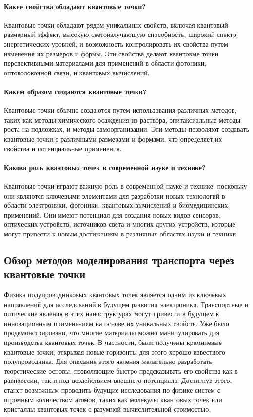 \documentclass[a4paper,14pt]{extarticle}
\begin{document}
\paragraph{Какие свойства обладают квантовые точки?}

Квантовые точки обладают рядом уникальных свойств, включая квантовый размерный эффект, высокую светоизлучающую способность, широкий спектр энергетических уровней, и возможность контролировать их свойства путем изменения их размеров и формы. Эти свойства делают квантовые точки перспективными материалами для применений в области фотоники, оптоволоконной связи, и квантовых вычислений.

\paragraph{Каким образом создаются квантовые точки?}

Квантовые точки обычно создаются путем использования различных методов, таких как методы химического осаждения из раствора, эпитаксиальные методы роста на подложках, и методы самоорганизации. Эти методы позволяют создавать квантовые точки с различными размерами и формами, что определяет их свойства и потенциальные применения.

\paragraph{Какова роль квантовых точек в современной науке и технике?}

Квантовые точки играют важную роль в современной науке и технике, поскольку они являются ключевыми элементами для разработки новых технологий в области электроники, фотоники, квантовых вычислений и биомедицинских применений. Они имеют потенциал для создания новых видов сенсоров, оптических устройств, источников света и многих других устройств, которые могут привести к новым достижениям в различных областях науки и техники.

\subsection{Обзор методов моделирования транспорта через квантовые точки}

Физика полупроводниковых квантовых точек является одним из ключевых направлений для исследований в будущем развитии электроники. Транспортные и оптические явления в этих наноструктурах могут привести в будущем к инновационным применениям на основе их уникальных свойств. Уже было продемонстрировано, что многие материалы можно манипулировать для производства квантовых точек. В частности, были получены кремниевые квантовые точки, открывая новые горизонты для этого хорошо известного полупроводника. Для описания этого явления желательно разработать теоретические основы, позволяющие быстро предсказывать его свойства как в равновесии, так и под воздействием внешнего потенциала. Достигнув этого, станет возможным проводить будущие исследования по физике систем с огромным количеством атомов, таких как молекулы квантовых точек или кристаллы квантовых точек с разумной вычислительной стоимостью.\cite{bolivar}
\end{document}
